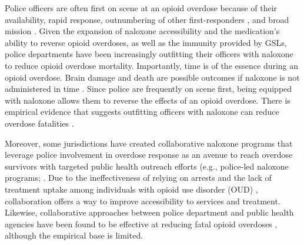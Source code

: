 Police officers are often first on scene at an opioid overdose because of their availability, rapid response, outnumbering of other first-responders \parencite{lurigio_opioid_2018}, and broad mission \parencite{pourtaher_naloxone_2022, white_leveraging_2022}. Given the expansion of naloxone accessibility and the medication's ability to reverse opioid overdoses, as well as the immunity provided by GSLs, police departments have been increasingly outfitting their officers with naloxone \parencite{lurigio_opioid_2018, ray_national_2023} to reduce opioid overdose mortality. Importantly, time is of the essence during an opioid overdose. Brain damage and death are possible outcomes if naloxone is not administered in time \parencite{winstanley_neurocognitive_2021}. Since police are frequently on scene first, being equipped with naloxone allows them to reverse the effects of an opioid overdose. There is empirical evidence that suggests outfitting officers with naloxone can reduce overdose fatalities \parencite{rando_intranasal_2015}.

Moreover, some jurisdictions have created collaborative naloxone programs that leverage police involvement in overdose response as an avenue to reach overdose survivors with targeted public health outreach efforts (e.g., police-led naloxone programs; \parencite{donnelly_law_2022, formica_characteristics_2021, yatsco_alternatives_2020}. Due to the ineffectiveness of relying on arrests and the lack of treatment uptake among individuals with opioid use disorder (OUD) \parencite{dowell_treatment_2024}, collaboration offers a way to improve accessibility to services and treatment. Likewise, collaborative approaches between police department and public health agencies have been found to be effective at reducing fatal opioid overdoses \parencite{donnelly_law_2022, xuan_association_2023}, although the empirical base is limited.

